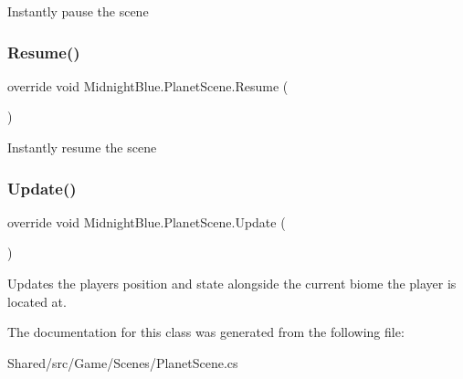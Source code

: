 Instantly pause the scene 

\hypertarget{class_midnight_blue_1_1_planet_scene_aa14750d3675b59462796e821b3921397}{}\label{class_midnight_blue_1_1_planet_scene_aa14750d3675b59462796e821b3921397} 
\subsubsection{\texorpdfstring{Resume()}{Resume()}}
{\footnotesize\ttfamily override void Midnight\+Blue.\+Planet\+Scene.\+Resume (\begin{DoxyParamCaption}{ }\end{DoxyParamCaption})\hspace{0.3cm}{\ttfamily [inline]}}



Instantly resume the scene 

\hypertarget{class_midnight_blue_1_1_planet_scene_add0a85b4f754f026231aa7269259c65c}{}\label{class_midnight_blue_1_1_planet_scene_add0a85b4f754f026231aa7269259c65c} 
\subsubsection{\texorpdfstring{Update()}{Update()}}
{\footnotesize\ttfamily override void Midnight\+Blue.\+Planet\+Scene.\+Update (\begin{DoxyParamCaption}{ }\end{DoxyParamCaption})\hspace{0.3cm}{\ttfamily [inline]}}



Updates the players position and state alongside the current biome the player is located at. 



The documentation for this class was generated from the following file\+:\begin{DoxyCompactItemize}
\item 
Shared/src/\+Game/\+Scenes/Planet\+Scene.\+cs\end{DoxyCompactItemize}

